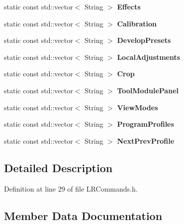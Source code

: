 \begin{DoxyCompactItemize}
\item 
static const std\+::vector$<$ String $>$ {\bfseries Effects}
\item 
static const std\+::vector$<$ String $>$ {\bfseries Calibration}\hypertarget{class_l_r_command_list_acc1538e546c20e2a87cac7d9d50618a1}{}\label{class_l_r_command_list_acc1538e546c20e2a87cac7d9d50618a1}

\item 
static const std\+::vector$<$ String $>$ {\bfseries Develop\+Presets}\hypertarget{class_l_r_command_list_ac29a4934ded5a0b8df049d38af02a413}{}\label{class_l_r_command_list_ac29a4934ded5a0b8df049d38af02a413}

\item 
static const std\+::vector$<$ String $>$ {\bfseries Local\+Adjustments}\hypertarget{class_l_r_command_list_a4f90d55a091e66e130b3eaa736155acb}{}\label{class_l_r_command_list_a4f90d55a091e66e130b3eaa736155acb}

\item 
static const std\+::vector$<$ String $>$ {\bfseries Crop}
\item 
static const std\+::vector$<$ String $>$ {\bfseries Tool\+Module\+Panel}
\item 
static const std\+::vector$<$ String $>$ {\bfseries View\+Modes}
\item 
static const std\+::vector$<$ String $>$ {\bfseries Program\+Profiles}
\item 
static const std\+::vector$<$ String $>$ {\bfseries Next\+Prev\+Profile}
\end{DoxyCompactItemize}


\subsection{Detailed Description}


Definition at line 29 of file L\+R\+Commands.\+h.



\subsection{Member Data Documentation}
